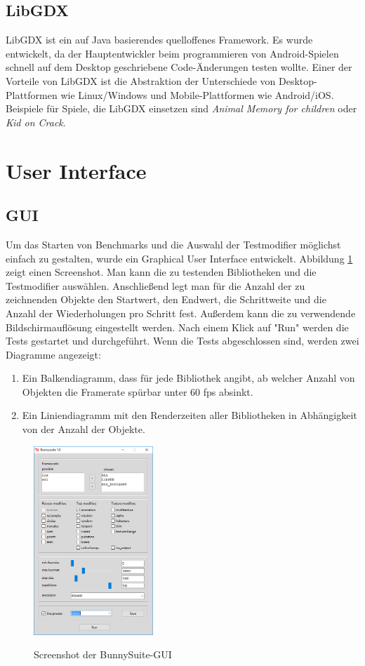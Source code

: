 \subsection{LibGDX}
LibGDX ist ein auf Java basierendes quelloffenes Framework. Es wurde entwickelt, da der Hauptentwickler beim programmieren von Android-Spielen schnell auf dem Desktop geschriebene Code-Änderungen testen wollte. Einer der Vorteile von LibGDX ist die Abstraktion der Unterschiede von Desktop-Plattformen wie Linux/Windows und Mobile-Plattformen wie Android/iOS. Beispiele für Spiele, die LibGDX einsetzen sind \emph{Animal Memory for children} oder \emph{Kid on Crack}.

\section{User Interface}
\subsection{GUI}
Um das Starten von Benchmarks und die Auswahl der Testmodifier möglichst einfach zu gestalten, wurde ein Graphical User Interface entwickelt. Abbildung \ref{dia:gui} zeigt einen Screenshot. Man kann die zu testenden Bibliotheken und die Testmodifier auswählen. Anschließend legt man für die Anzahl der zu zeichnenden Objekte den Startwert, den Endwert, die Schrittweite und die Anzahl der Wiederholungen pro Schritt fest. Außerdem kann die zu verwendende Bildschirmauflösung eingestellt werden. Nach einem Klick auf "Run" werden die Tests gestartet und durchgeführt. Wenn die Tests abgeschlossen sind, werden zwei Diagramme angezeigt: 
\begin{enumerate}
\item Ein Balkendiagramm, dass für jede Bibliothek angibt, ab welcher Anzahl von Objekten die Framerate spürbar unter 60 fps absinkt.
\item Ein Liniendiagramm mit den Renderzeiten aller Bibliotheken in Abhängigkeit von der Anzahl der Objekte.
\end{enumerate}

\begin{figure}[h]
\caption{Screenshot der BunnySuite-GUI}
\centering
\includegraphics[width=0.4\textwidth]{gui}
\label{dia:gui}
\end{figure}

